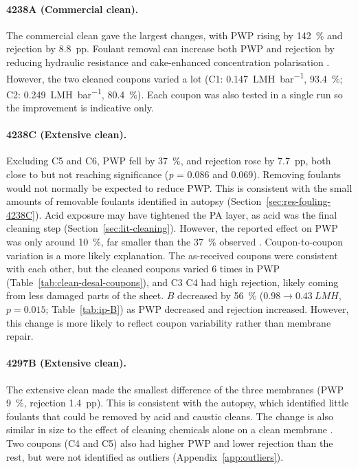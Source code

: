  \paragraph{4238A (Commercial clean).}
The commercial clean gave the largest changes, with PWP rising by \qty{142}{\percent} and rejection by \qty{8.8}{pp}. Foulant removal can increase both PWP and rejection by reducing hydraulic resistance and cake-enhanced concentration polarisation \citep{elimelech2005chemical}. However, the two cleaned coupons varied a lot (C1: \qty{0.147}{LMH.bar^{-1}}, \qty{93.4}{\percent}; C2: \qty{0.249}{LMH.bar^{-1}}, \qty{80.4}{\percent}). Each coupon was also tested in a single run so the improvement is indicative only.

\paragraph{4238C (Extensive clean).}
Excluding C5 and C6, PWP fell by \qty{37}{\percent}, and rejection rose by \qty{7.7}{pp}, both close to but not reaching significance (\textit{p} = 0.086 and 0.069). Removing foulants would not normally be expected to reduce PWP. This is consistent with the small amounts of removable foulants identified in autopsy (Section~\ref{sec:res-fouling-4238C}). Acid exposure may have tightened the PA layer, as acid was the final cleaning step (Section~\ref{sec:lit-cleaning}). However,  the reported effect on PWP was only around \qty{10}{\percent}, far smaller than the \qty{37}{\percent} observed \citep{tu2015chemical}. Coupon-to-coupon variation is a more likely explanation. The as-received coupons were consistent with each other, but the cleaned coupons varied 6 times in PWP (Table~\ref{tab:clean-desal-coupons}), and C3 C4 had high rejection, likely coming from less damaged parts of the sheet. $B$ decreased by \qty{56}{\percent} ($0.98 \to \qty{0.43}{LMH}$, $p = 0.015$; Table~\ref{tab:ip-B}) as PWP decreased and rejection increased. However, this change is more likely to reflect coupon variability rather than membrane repair. 

\paragraph{4297B (Extensive clean).}
The extensive clean made the smallest difference of the three membranes (PWP \qty{+9}{\percent}, rejection \qty{+1.4}{pp}). This is consistent with the autopsy, which identified little foulants that could be removed by acid and caustic cleans. The change is also similar in size to the effect of cleaning chemicals alone on a clean membrane \citep{tu2015chemical}. Two coupons (C4 and C5) also had higher PWP and lower rejection than the rest, but were not identified as outliers (Appendix~\ref{app:outliers}).


